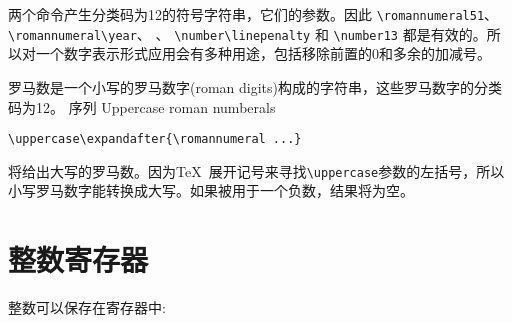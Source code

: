 \documentclass{book}
\begin{document}
两个命令产生分类码为12的符号字符串，它们的参数。因此 
\verb-\romannumeral51-、 \verb-\romannumeral\year-、 
、 \verb-\number\linepenalty- 和 \verb-\number13- 都是有效的。所以对一个数字表示形式应用会有多种用途，包括移除前置的0和多余的加减号。


罗马数是一个小写的罗马数字(roman digits)构成的字符串，这些罗马数字的分类码为12。
序列 \howto Uppercase roman numberals\par

\begin{verbatim}
\uppercase\expandafter{\romannumeral ...}
\end{verbatim}

将给出大写的罗马数。因为\TeX\  展开记号来寻找\verb=\uppercase=参数的左括号，所以小写罗马数字能转换成大写。如果被用于一个负数，结果将为空。

\section{整数寄存器}

整数可以保存在寄存器中:
\end{document}
